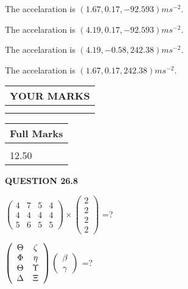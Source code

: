 \documentclass[12pt]{article}
\begin{document}
  
 
 
  The accelaration is $  %
(
1.67,
0.17,
-92.593)
ms^{-2} $.
 
 
  The accelaration is $  %
(
4.19,
0.17,
-92.593)
ms^{-2} $.
 
 
  The accelaration is $  %
(
4.19,
-0.58,
242.38)
ms^{-2} $.
 
 
  The accelaration is $  %
(
1.67,
0.17,
242.38)
ms^{-2} $.
 
 
 

 
 
\vspace{0.3in}
  
\vspace{0.2in}
  
\noindent\begin{tabular}{|l|}
\hline
 YOUR MARKS  \\
\hline
 \\ 
 \\ 
\hline
\end{tabular}
\hspace{0.05in} \begin{tabular}{|l|}
\hline
 Full Marks  \\
\hline
 \\ 
12.50 \\
\hline
\end{tabular}
{\textbf{\Large{QUESTION
26.8 
}}}
  
  
 
$ \left( \begin{array}{ccccccccc}
           4  & 
           7  & 
           5  & 
           4  \\ 
           4  & 
           4  & 
           4  & 
           4  \\ 
           5  & 
           6  & 
           5  & 
           5
\end{array}\right) \times
\left( \begin{array}{c}
           2  \\ 
           2  \\ 
           2  \\ 
           2
\end{array}\right) $ =?
 
 
$  %
 \left( \begin{array}
 {
 c
 c
 }
 \Theta & 
                    \zeta \\ 
 \Phi & 
 \eta \\ 
 \Theta & 
 \Upsilon \\ 
 \Delta & 
                    \Xi
 \end{array} \right)
 \left( \begin{array}
 {
 c
 }
 \beta \\ 
 \gamma
 \end{array} \right)
$ =?
 
\end{document}
